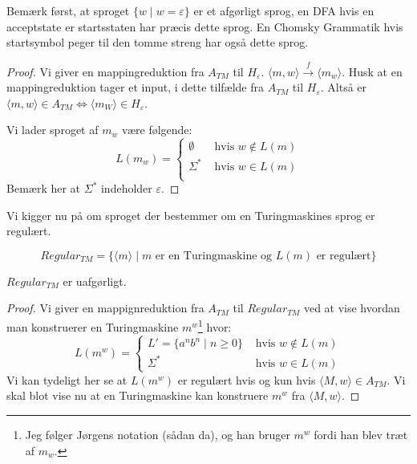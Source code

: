 Bemærk først, at sproget $\{w \mid w = \varepsilon\}$ er et afgørligt sprog, en DFA hvis en acceptstate er startsstaten har præcis dette sprog. En Chomsky Grammatik hvis startsymbol peger til den tomme streng har også dette sprog.

\begin{proof}
	Vi giver en mappingreduktion fra $A_{TM}$ til $H_{\varepsilon}$. $\langle m , w\rangle \stackrel{f}{\longrightarrow} \langle m_{w} \rangle $. Husk at en mappingreduktion tager et input, i dette tilfælde fra $A_{TM}$ til $H_{\varepsilon}$. Altså er $\langle m , w \rangle \in A_{TM} \iff \langle m_{W} \rangle \in H_{\varepsilon}$.

	Vi lader sproget af $m_{w}$ være følgende:
	\begin{equation*}
		L(m_{w}) = \begin{cases}
			\emptyset  & \text{ hvis } w \notin L(m) \\
			\Sigma^{*} & \text{ hvis } w \in L(m)    \\
		\end{cases}
	\end{equation*}
	Bemærk her at $\Sigma^{*}$ indeholder $\varepsilon$.
\end{proof}

Vi kigger nu på om sproget der bestemmer om en Turingmaskines sprog er regulært.

\begin{equation}
	Regular_{TM} = \{ \langle m \rangle \mid m \text{ er en Turingmaskine og } L(m) \text{ er regulært} \}
\end{equation}

\begin{theorem}
	$Regular_{TM}$ er uafgørligt.
\end{theorem}

\begin{proof}
	Vi giver en mappignreduktion fra $A_{TM}$ til $Regular_{TM}$ ved at vise hvordan man konstruerer en Turingmaskine $m^{w}$\footnote{Jeg følger Jørgens notation (sådan da), og han bruger $m^{w}$ fordi han blev træt af $m_{w}$.} hvor:
	\begin{equation*}
		L(m^{w}) = \begin{cases}
			L' = \{a^{n}b^{n} \mid n \ge 0\} & \text{ hvis } w \notin L(m) \\
			\Sigma^{*}                       & \text{ hvis } w \in L(m)
		\end{cases}
	\end{equation*}
	Vi kan tydeligt her se at $L(m^{w})$ er regulært hvis og kun hvis $\langle M, w \rangle \in A_{TM}$. Vi skal blot vise nu at en Turingmaskine kan konstruere $m^{w}$ fra $\langle M , w \rangle $.
\end{proof}

